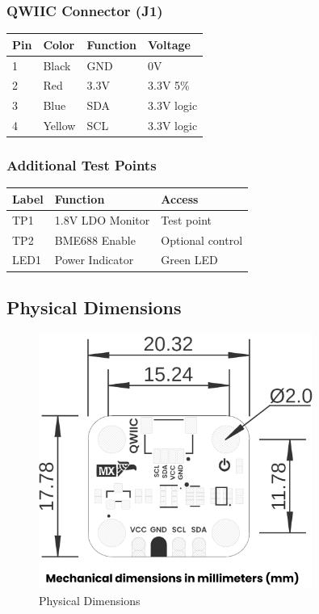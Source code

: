 \documentclass[11pt,a4paper]{article}
\begin{document}
\subsubsection{QWIIC Connector (J1)}

\begin{table}[H]
\centering
\begin{tabular}{llll}
\toprule
Pin & Color & Function & Voltage \\
\midrule
1 & Black & GND & 0V \\
2 & Red & 3.3V & 3.3V \textpm{}5\% \\
3 & Blue & SDA & 3.3V logic \\
4 & Yellow & SCL & 3.3V logic \\
\bottomrule
\end{tabular}
\end{table}


\subsubsection{Additional Test Points}

\begin{table}[H]
\centering
\begin{tabular}{lll}
\toprule
Label & Function & Access \\
\midrule
TP1 & 1.8V LDO Monitor & Test point \\
TP2 & BME688 Enable & Optional control \\
LED1 & Power Indicator & Green LED \\
\bottomrule
\end{tabular}
\end{table}


\subsection{Physical Dimensions}

\begin{figure}[H]
\centering
\includegraphics[width=0.8\textwidth]{unit_dimension_v_1_0_0_ue0094_icp10111_barometric_pressure_sensor.png}
\caption{Physical Dimensions}
\end{figure}
\end{document}
